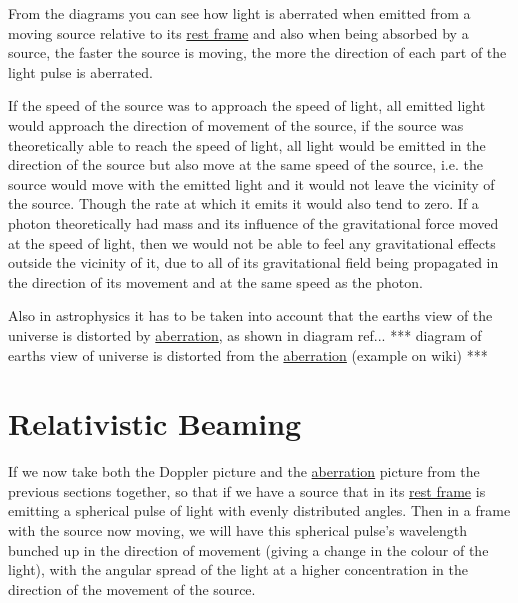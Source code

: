 From the diagrams you can see how light is aberrated when emitted from a moving source relative to its \hyperlink{def-proper-frame}{rest frame} and also when being absorbed by a source, the faster the source is moving, the more the direction of each part of the light pulse is aberrated.

If the speed of the source was to approach the speed of light, all emitted light would approach the direction of movement of the source, if the source was theoretically able to reach the speed of light, all light would be emitted in the direction of the source but also move at the same speed of the source, i.e. the source would move with the emitted light and it would not leave the vicinity of the source. Though the rate at which it emits it would also tend to zero. If a photon theoretically had mass and its influence of the gravitational force moved at the speed of light, then we would not be able to feel any gravitational effects outside the vicinity of it, due to all of its gravitational field being propagated in the direction of its movement and at the same speed as the photon.


Also in astrophysics it has to be taken into account that the earths view of the universe is distorted by \hyperlink{def-aberration}{aberration}, as shown in diagram ref{...} *** diagram of earths view of universe is distorted from the \hyperlink{def-aberration}{aberration} (example on wiki) ***

\section{Relativistic Beaming}

If we now take both the Doppler picture and the \hyperlink{def-aberration}{aberration} picture from the previous sections together, so that if we have a source that in its \hyperlink{def-proper-frame}{rest frame} is emitting a spherical pulse of light with evenly distributed angles. Then in a frame with the source now moving, we will have this spherical pulse's wavelength bunched up in the direction of movement (giving a change in the colour of the light), with the angular spread of the light at a higher concentration in the direction of the movement of the source.


